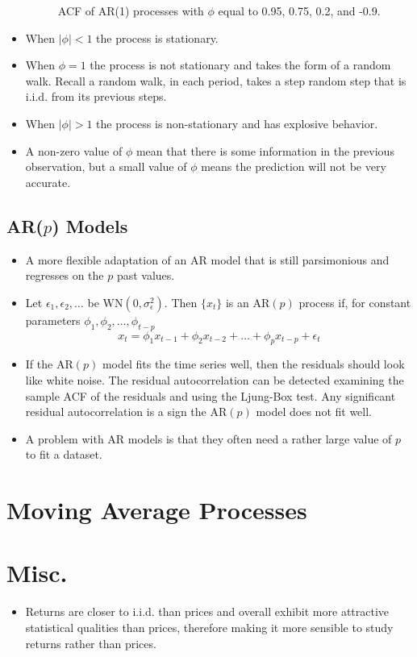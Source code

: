 \documentclass[11pt]{article}
\begin{document}
\begin{itemize}
\begin{figure}[H]
        \caption{ACF of AR(1) processes with $\phi$ equal to 0.95, 0.75, 0.2, and -0.9.}
    \end{figure}
    \item When $|\phi| < 1$ the process is stationary.
    \item When $\phi=1$ the process is not stationary and takes the form of a random walk.
    Recall a random walk, in each period, takes a step random step that is i.i.d. from its 
    previous steps. 
    \item When $|\phi|>1$ the process is non-stationary and has explosive behavior.
    \item A non-zero value of $\phi$ mean that there is some information in the previous
    observation, but a small value of $\phi$ means the prediction will not be very accurate.
\end{itemize}

\subsection{AR($p$) Models}
\begin{itemize}
    \item A more flexible adaptation of an AR model that is still parsimonious and regresses on
    the $p$ past values.
    \item Let $\epsilon_1, \epsilon_2, \ldots$ be $\text{WN}(0, \sigma_{\epsilon}^{2})$. Then 
    $\{x_t\}$ is an $\text{AR}(p)$ process if, for constant parameters $\phi_1, \phi_2, \hdots,
    \phi_{t-p}$
    \[x_t = \phi_1 x_{t-1} + \phi_2 x_{t-2} + \hdots + \phi_p x_{t-p} + \epsilon_t\]
    \item If the $\text{AR}(p)$ model fits the time series well, then the residuals should look 
    like white noise. The residual autocorrelation can be detected examining the sample ACF of
    the residuals and using the Ljung-Box test. Any significant residual autocorrelation is a sign 
    the $\text{AR}(p)$ model does not fit well.
    \item A problem with AR models is that they often need a rather large value of $p$ to fit 
    a dataset.
\end{itemize}

\section{Moving Average Processes}


\section{Misc.}
\begin{itemize}
    \item Returns are closer to i.i.d. than prices and overall exhibit more attractive 
    statistical qualities than prices, therefore making it more sensible to study returns 
    rather than prices. 
\end{itemize}
\end{document}
